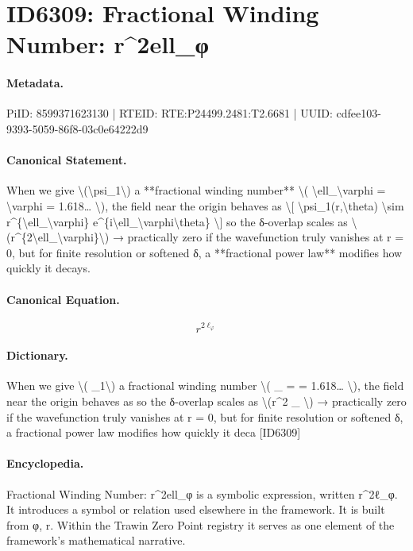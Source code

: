 \section*{ID6309: Fractional Winding Number: r\textasciicircum{}2ell\_φ}
\paragraph{Metadata.}
PiID: 8599371623130 | RTEID: RTE:P24499.2481:T2.6681 | UUID: cdfee103-9393-5059-86f8-03c0e64222d9

\paragraph{Canonical Statement.}
When we give \textbackslash{}(\textbackslash{}psi\_1\textbackslash{}) a **fractional winding number** \textbackslash{}( \textbackslash{}ell\_\textbackslash{}varphi = \textbackslash{}varphi = 1.618… \textbackslash{}), the field near the origin behaves as \textbackslash{}[ \textbackslash{}psi\_1(r,\textbackslash{}theta) \textbackslash{}sim r\textasciicircum{}\{\textbackslash{}ell\_\textbackslash{}varphi\} e\textasciicircum{}\{i\textbackslash{}ell\_\textbackslash{}varphi\textbackslash{}theta\} \textbackslash{}] so the δ-overlap scales as \textbackslash{}(r\textasciicircum{}\{2\textbackslash{}ell\_\textbackslash{}varphi\}\textbackslash{}) → practically zero if the wavefunction truly vanishes at r = 0, but for finite resolution or softened δ, a **fractional power law** modifies how quickly it decays.

\paragraph{Canonical Equation.}
\[
r^{2\ell_\varphi}
\]

\paragraph{Dictionary.}
When we give \textbackslash{}( \_1\textbackslash{}) a fractional winding number \textbackslash{}( \_ = = 1.618… \textbackslash{}), the field near the origin behaves as so the δ-overlap scales as \textbackslash{}(r\textasciicircum{}2 \_ \textbackslash{}) → practically zero if the wavefunction truly vanishes at r = 0, but for finite resolution or softened δ, a fractional power law modifies how quickly it deca [ID6309]

\paragraph{Encyclopedia.}
Fractional Winding Number: r\textasciicircum{}2ell\_φ is a symbolic expression, written r\textasciicircum{}2ℓ\_φ. It introduces a symbol or relation used elsewhere in the framework. It is built from φ, r. Within the Trawin Zero Point registry it serves as one element of the framework's mathematical narrative.
